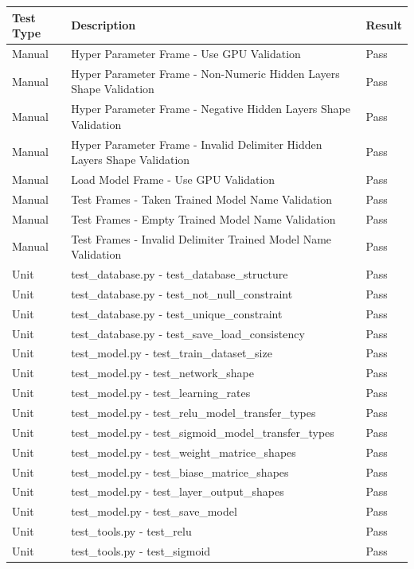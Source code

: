 \documentclass[./project-report/src/latex/project-report.tex]{subfiles}
\begin{document}
\begin{tabular}{|p{0.15\linewidth}|p{0.76\linewidth}|p{0.09\linewidth}|}
	\hline
	\textbf{Test Type} & \textbf{Description} & \textbf{Result} \\
	\hline
	Manual & Hyper Parameter Frame - Use GPU Validation & Pass \\
	\hline
	Manual & Hyper Parameter Frame - Non-Numeric Hidden Layers Shape Validation & Pass \\
	\hline
	Manual & Hyper Parameter Frame - Negative Hidden Layers Shape Validation & Pass \\
	\hline
	Manual & Hyper Parameter Frame - Invalid Delimiter Hidden Layers Shape Validation & Pass \\
	\hline
	Manual & Load Model Frame - Use GPU Validation & Pass \\
	\hline
	Manual & Test Frames - Taken Trained Model Name Validation & Pass \\
	\hline
	Manual & Test Frames - Empty Trained Model Name Validation & Pass \\
	\hline
	Manual & Test Frames - Invalid Delimiter Trained Model Name Validation & Pass \\
	\hline
	Unit & test\_database.py - test\_database\_structure & Pass \\
	\hline
	Unit & test\_database.py - test\_not\_null\_constraint & Pass \\
	\hline
	Unit & test\_database.py - test\_unique\_constraint & Pass \\
	\hline
	Unit & test\_database.py - test\_save\_load\_consistency & Pass \\
	\hline
	Unit & test\_model.py - test\_train\_dataset\_size & Pass \\
	\hline
	Unit & test\_model.py - test\_network\_shape & Pass \\
	\hline
	Unit & test\_model.py - test\_learning\_rates & Pass \\
	\hline
	Unit & test\_model.py - test\_relu\_model\_transfer\_types & Pass \\
	\hline
	Unit & test\_model.py - test\_sigmoid\_model\_transfer\_types & Pass \\
	\hline
	Unit & test\_model.py - test\_weight\_matrice\_shapes & Pass \\
	\hline
	Unit & test\_model.py - test\_biase\_matrice\_shapes & Pass \\
	\hline
	Unit & test\_model.py - test\_layer\_output\_shapes & Pass \\
	\hline
	Unit & test\_model.py - test\_save\_model & Pass \\
	\hline
	Unit & test\_tools.py - test\_relu & Pass \\
	\hline
	Unit & test\_tools.py - test\_sigmoid & Pass \\
	\hline
\end{tabular}
\end{document}
